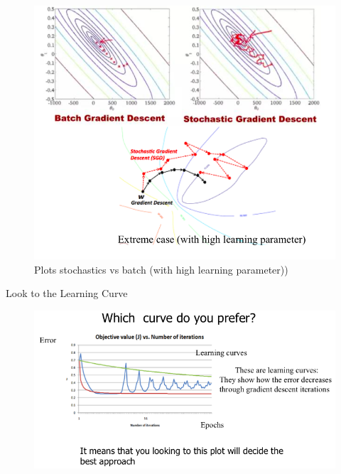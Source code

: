 \documentclass[../main.tex]{subfiles}
\begin{document}
\begin{figure}[H]
    \centering
    \includegraphics[scale = 0.4]{lectures/4_neural_networks/4_plots_batch_sto.png}
    \caption{Plots stochastics vs batch (with high learning parameter))}
    \label{fig:4_plots_batch_sto}
\end{figure}
Look to the Learning Curve\\
\begin{figure}[H]
    \centering
    \includegraphics[scale = 0.5]{lectures/4_neural_networks/4_plots_learning_curve.png}
\end{figure}
\end{document}
